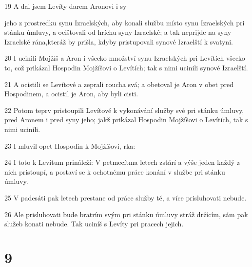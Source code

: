 \par 19 A dal jsem Levíty darem Aronovi i sy\par jeho z prostredku synu Izraelských, aby konali službu místo synu Izraelských pri stánku úmluvy, a ocištovali od hríchu syny Izraelské; a tak neprijde na syny Izraelské rána,kteráž by prišla, kdyby pristupovali synové Izraelští k svatyni.
\par 20 I ucinili Mojžíš a Aron i všecko množství synu Izraelských pri Levítích všecko to, což prikázal Hospodin Mojžíšovi o Levítích; tak s nimi ucinili synové Izraelští.
\par 21 A ocistili se Levítové a zeprali roucha svá; a obetoval je Aron v obet pred Hospodinem, a ocistil je Aron, aby byli cisti.
\par 22 Potom teprv pristoupili Levítové k vykonávání služby své pri stánku úmluvy, pred Aronem i pred syny jeho; jakž prikázal Hospodin Mojžíšovi o Levítích, tak s nimi ucinili.
\par 23 I mluvil opet Hospodin k Mojžíšovi, rka:
\par 24 I toto k Levítum prináleží: V petmecítma letech zstárí a výše jeden každý z nich pristoupí, a postaví se k ochotnému práce konání v službe pri stánku úmluvy.
\par 25 V padesáti pak letech prestane od práce služby té, a více prisluhovati nebude.
\par 26 Ale prisluhovati bude bratrím svým pri stánku úmluvy stráž držícím, sám pak služeb konati nebude. Tak uciníš s Levíty pri pracech jejich.

\chapter{9}

